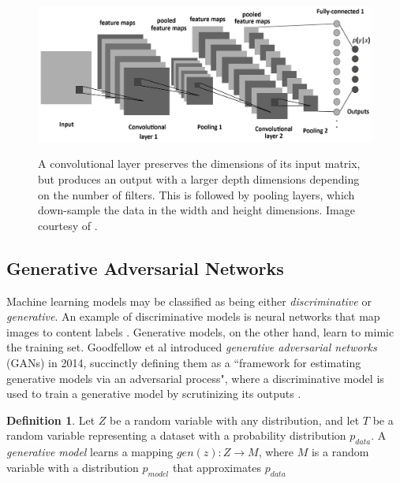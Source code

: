 \documentclass[12pt, titlepage]{report}
\theoremstyle{definition}
\newtheorem{definition}{Definition}
\begin{document}
\begin{figure}
\centering
\includegraphics[width=1\textwidth]{img/conv_pooling.png}\\
\caption{A convolutional layer preserves the dimensions of its input matrix, but produces an output with a larger depth dimensions depending on the number of filters. This is followed by pooling layers, which down-sample the data in the width and height dimensions. Image courtesy of \cite{albelwi2017framework}.}
\label{figure:conv_pooling}
\end{figure}



\subsection{Generative Adversarial Networks}\label{subsection:generativeadversarial}
Machine learning models may be classified as being either \textit{discriminative} or \textit{generative}. An example of discriminative models is neural networks that map images to content labels \cite[p. 1]{goodfellow2014generative}. Generative models, on the other hand, learn to mimic the training set. Goodfellow et al introduced \emph{generative adversarial networks} (GANs) in 2014, succinctly defining them as a ``framework for estimating generative models via an adversarial process", where a discriminative model is used to train a generative model by scrutinizing its outputs \cite[p. 1]{goodfellow2014generative}.

\begin{definition}
Let $Z$ be a random variable with any distribution, and let $T$ be a random variable representing a dataset with a probability distribution $p_{data}$. A \emph{generative model} learns a mapping $gen(z) : Z \rightarrow M$, where $M$ is a random variable with a distribution $p_{model}$ that approximates $p_{data}$ \cite{goodfellow2016nips.}
\end{definition}
\end{document}

